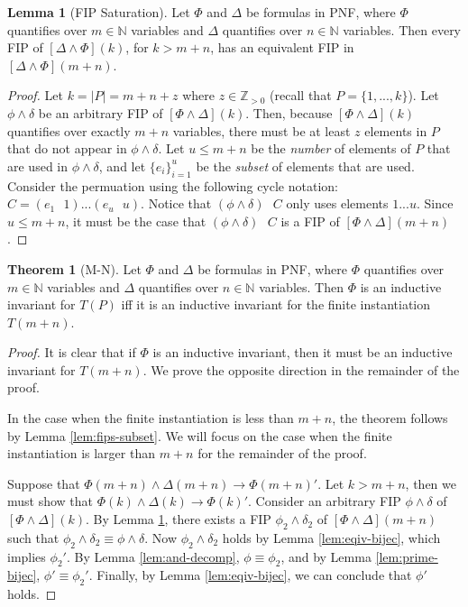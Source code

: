 \documentclass[12pt]{article}
\theoremstyle{definition}
\newtheorem{lemma}{Lemma}
\newtheorem{theorem}{Theorem}
\theoremstyle{remark}
\newcommand{\msp}{\text{ }}
\begin{document}
\begin{lemma}[FIP Saturation]
  \label{lem:fip-sat}
  Let $\Phi$ and $\Delta$ be formulas in PNF, where $\Phi$ quantifies over $m \in \mathbb{N}$ variables and $\Delta$ quantifies over $n \in \mathbb{N}$ variables.  Then every FIP of $[\Delta \land \Phi](k)$, for $k > m+n$, has an equivalent FIP in $[\Delta \land \Phi](m+n)$.
\end{lemma}
\begin{proof}
  Let $k = |P| = m + n + z$ where $z \in \mathbb{Z}_{>0}$ (recall that $P = \{1,...,k\}$).  Let $\phi\land\delta$ be an arbitrary FIP of $[\Phi\land\Delta](k)$.  Then, because $[\Phi\land\Delta](k)$ quantifies over exactly $m+n$ variables, there must be at least $z$ elements in $P$ that do not appear in $\phi\land\delta$.  Let $u \leq m+n$ be the \textit{number} of elements of $P$ that are used in $\phi \land \delta$, and let $\{e_i\}_{i=1}^{u}$ be the \textit{subset} of elements that are used.  Consider the permuation using the following cycle notation: $C = (e_1 \msp 1)...(e_u \msp u)$.  Notice that $(\phi \land \delta) \msp C$ only uses elements $1 ... u$.  Since $u \leq m+n$, it must be the case that $(\phi \land \delta) \msp C$ is a FIP of $[\Phi \land \Delta](m+n)$.
\end{proof}

\begin{theorem}[M-N]
  Let $\Phi$ and $\Delta$ be formulas in PNF, where $\Phi$ quantifies over $m \in \mathbb{N}$ variables and $\Delta$ quantifies over $n \in \mathbb{N}$ variables.  Then $\Phi$ is an inductive invariant for $T(P)$ iff it is an inductive invariant for the finite instantiation $T(m+n)$.
\end{theorem}
\begin{proof}
  It is clear that if $\Phi$ is an inductive invariant, then it must be an inductive invariant for $T(m+n)$.  We prove the opposite direction in the remainder of the proof.

  In the case when the finite instantiation is less than $m+n$, the theorem follows by Lemma \ref{lem:fips-subset}.  We will focus on the case when the finite instantiation is larger than $m+n$ for the remainder of the proof.

  Suppose that $\Phi(m+n) \land \Delta(m+n) \rightarrow \Phi(m+n)'$.  Let $k > m+n$, then we must show that $\Phi(k) \land \Delta(k) \rightarrow \Phi(k)'$.  Consider an arbitrary FIP $\phi\land\delta$ of $[\Phi\land\Delta](k)$.  By Lemma \ref{lem:fip-sat}, there exists a FIP $\phi_2\land\delta_2$ of $[\Phi\land\Delta](m+n)$ such that $\phi_2\land\delta_2 \equiv \phi\land\delta$.  Now $\phi_2\land\delta_2$ holds by Lemma \ref{lem:eqiv-bijec}, which implies $\phi_2'$.  By Lemma \ref{lem:and-decomp}, $\phi \equiv \phi_2$, and by Lemma \ref{lem:prime-bijec}, $\phi' \equiv \phi_2'$.  Finally, by Lemma \ref{lem:eqiv-bijec}, we can conclude that $\phi'$ holds.
\end{proof}
\end{document}
